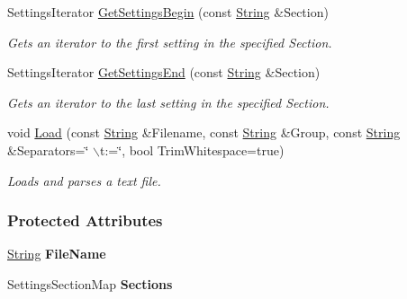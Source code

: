 \begin{DoxyCompactItemize}
SettingsIterator \hyperlink{classMezzanine_1_1Resource_1_1TextSettingsFile_a9bf4f3b5941be890a27466133a4a4b12}{GetSettingsBegin} (const \hyperlink{namespaceMezzanine_acf9fcc130e6ebf08e3d8491aebcf1c86}{String} \&Section)
\begin{DoxyCompactList}\small\item\em Gets an iterator to the first setting in the specified Section. \item\end{DoxyCompactList}\item 
SettingsIterator \hyperlink{classMezzanine_1_1Resource_1_1TextSettingsFile_a49131d2303b455296dac96b566b87685}{GetSettingsEnd} (const \hyperlink{namespaceMezzanine_acf9fcc130e6ebf08e3d8491aebcf1c86}{String} \&Section)
\begin{DoxyCompactList}\small\item\em Gets an iterator to the last setting in the specified Section. \item\end{DoxyCompactList}\item 
void \hyperlink{classMezzanine_1_1Resource_1_1TextSettingsFile_a5ffb86d6822701880e1dc47b4f37a637}{Load} (const \hyperlink{namespaceMezzanine_acf9fcc130e6ebf08e3d8491aebcf1c86}{String} \&Filename, const \hyperlink{namespaceMezzanine_acf9fcc130e6ebf08e3d8491aebcf1c86}{String} \&Group, const \hyperlink{namespaceMezzanine_acf9fcc130e6ebf08e3d8491aebcf1c86}{String} \&Separators=\char`\"{} $\backslash$t:=\char`\"{}, bool TrimWhitespace=true)
\begin{DoxyCompactList}\small\item\em Loads and parses a text file. \item\end{DoxyCompactList}\end{DoxyCompactItemize}
\subsubsection*{Protected Attributes}
\begin{DoxyCompactItemize}
\item 
\hypertarget{classMezzanine_1_1Resource_1_1TextSettingsFile_a0e391a598d79ac3252d5b539e38fb037}{
\hyperlink{namespaceMezzanine_acf9fcc130e6ebf08e3d8491aebcf1c86}{String} {\bfseries FileName}}
\label{classMezzanine_1_1Resource_1_1TextSettingsFile_a0e391a598d79ac3252d5b539e38fb037}

\item 
\hypertarget{classMezzanine_1_1Resource_1_1TextSettingsFile_a237130c9fefec3c4d25826333166ec40}{
SettingsSectionMap {\bfseries Sections}}
\label{classMezzanine_1_1Resource_1_1TextSettingsFile_a237130c9fefec3c4d25826333166ec40}

\end{DoxyCompactItemize}


